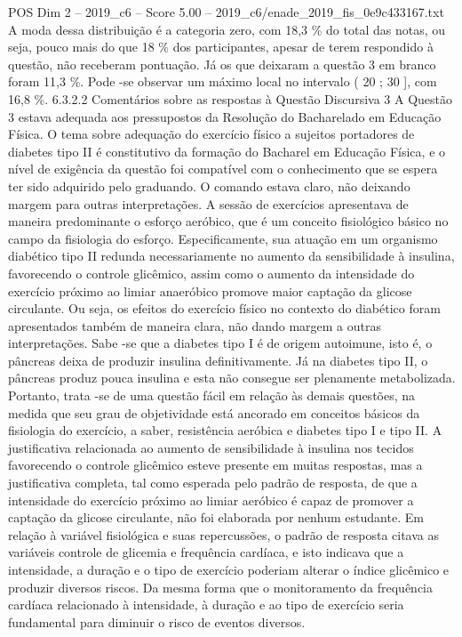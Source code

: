 \begin{textsample}{POS Dim 2 – 2019\_c6 – Score 5.00 – 2019\_c6/enade\_2019\_fis\_0e9c433167.txt}
A moda dessa distribuição é a categoria zero, com 18,3 \% do total das notas, ou seja, pouco mais do que 18 \% dos participantes, apesar de terem respondido à questão, não receberam pontuação.
Já os que deixaram a questão 3 em branco foram 11,3 \%.
Pode -se observar um máximo local no intervalo ( 20 ; 30 ], com 16,8 \%. 6.3.2.2 Comentários sobre as respostas à Questão Discursiva 3 A Questão 3 estava adequada aos pressupostos da Resolução do Bacharelado em Educação Física.
O tema sobre adequação do exercício físico a sujeitos portadores de diabetes tipo II é constitutivo da formação do Bacharel em Educação Física, e o nível de exigência da questão foi compatível com o conhecimento que se espera ter sido adquirido pelo graduando.
O comando estava claro, não deixando margem para outras interpretações.
A sessão de exercícios apresentava de maneira predominante o esforço aeróbico, que é um conceito fisiológico básico no campo da fisiologia do esforço.
Especificamente, sua atuação em um organismo diabético tipo II redunda necessariamente no aumento da sensibilidade à insulina, favorecendo o controle glicêmico, assim como o aumento da intensidade do exercício próximo ao limiar anaeróbico promove maior captação da glicose circulante.
Ou seja, os efeitos do exercício físico no contexto do diabético foram apresentados também de maneira clara, não dando margem a outras interpretações.
Sabe -se que a diabetes tipo I é de origem autoimune, isto é, o pâncreas deixa de produzir insulina definitivamente.
Já na diabetes tipo II, o pâncreas produz pouca insulina e esta não consegue ser plenamente metabolizada.
Portanto, trata -se de uma questão fácil em relação às demais questões, na medida que seu grau de objetividade está ancorado em conceitos básicos da fisiologia do exercício, a saber, resistência aeróbica e diabetes tipo I e tipo II.
A justificativa relacionada ao aumento de sensibilidade à insulina nos tecidos favorecendo o controle glicêmico esteve presente em muitas respostas, mas a justificativa completa, tal como esperada pelo padrão de resposta, de que a intensidade do exercício próximo ao limiar aeróbico é capaz de promover a captação da glicose circulante, não foi elaborada por nenhum estudante.
Em relação à variável fisiológica e suas repercussões, o padrão de resposta citava as variáveis controle de glicemia e frequência cardíaca, e isto indicava que a intensidade, a duração e o tipo de exercício poderiam alterar o índice glicêmico e produzir diversos riscos.
Da mesma forma que o monitoramento da frequência cardíaca relacionado à intensidade, à duração e ao tipo de exercício seria fundamental para diminuir o risco de eventos diversos.

\end{textsample}
